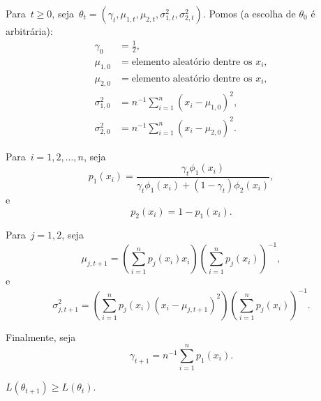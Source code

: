  Para~$t \ge 0$, seja~$\theta_t=(\gamma_t,\mu_{1,t},\mu_{2,t},
 \sigma_{1,t}^2, \sigma_{2,t}^2)$.
 Pomos (a escolha de $\theta_0$ é arbitrária):
 $$\begin{aligned}
 \gamma_0       &= \frac{1}{2}, \\
 \mu_{1,0}      &= \text{elemento aleatório dentre os } x_i,\\
 \mu_{2,0}      &= \text{elemento aleatório dentre os } x_i,\\
 \sigma_{1,0}^2 &= n^{-1}\sum_{i=1}^{n}(x_i - \mu_{1,0})^2,\\
 \sigma_{2,0}^2 &= n^{-1}\sum_{i=1}^{n}(x_i - \mu_{2,0})^2.
 \end{aligned}$$
 
 Para~$i=1,2,\dots,n$, seja
 $$p_1(x_i) = \frac{\gamma_t \phi_1(x_i)}
 {\gamma_t \phi_1(x_i) + (1-\gamma_t) \phi_2(x_i)},$$
 e
 $$p_2(x_i)=1-p_1(x_i).$$
 
 Para~$j=1,2$, seja
 $$\mu_{j,t+1}=\left(\sum_{i=1}^{n}p_j(x_i)x_i\right)
 \left(\sum_{i=1}^{n}p_j(x_i)\right)^{-1},$$
 e
 $$\sigma_{j,t+1}^2=\left(\sum_{i=1}^{n}p_j(x_i)(x_i-\mu_{j,t+1})^2\right)
 \left(\sum_{i=1}^{n}p_j(x_i)\right)^{-1}.$$
 
 Finalmente, seja
 $$\gamma_{t+1}=n^{-1}\sum_{i=1}^{n}p_1(x_i).$$
 
 \begin{teorema}
  $L(\theta_{t+1}) \ge L(\theta_t)$.
 \end{teorema}

